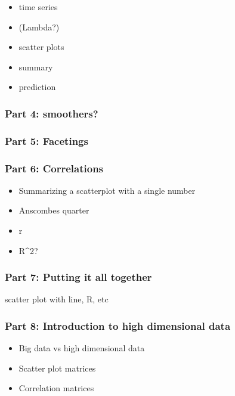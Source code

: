 \documentclass[
]{book}
\providecommand{\tightlist}{%
  \setlength{\itemsep}{0pt}\setlength{\parskip}{0pt}}
\begin{document}
\begin{itemize}
\tightlist
\item
  time series
\item
  (Lambda?)
\item
  scatter plots
\item
  summary
\item
  prediction
\end{itemize}

\hypertarget{part-4-smoothers}{%
\subsubsection{Part 4: smoothers?}\label{part-4-smoothers}}

\hypertarget{part-5-facetings}{%
\subsubsection{Part 5: Facetings}\label{part-5-facetings}}

\hypertarget{part-6-correlations}{%
\subsubsection{Part 6: Correlations}\label{part-6-correlations}}

\begin{itemize}
\tightlist
\item
  Summarizing a scatterplot with a single number
\item
  Anscombes quarter
\item
  r
\item
  R\^{}2?
\end{itemize}

\hypertarget{part-7-putting-it-all-together}{%
\subsubsection{Part 7: Putting it all together}\label{part-7-putting-it-all-together}}

scatter plot with line, R, etc

\hypertarget{part-8-introduction-to-high-dimensional-data}{%
\subsubsection{Part 8: Introduction to high dimensional data}\label{part-8-introduction-to-high-dimensional-data}}

\begin{itemize}
\tightlist
\item
  Big data vs high dimensional data
\item
  Scatter plot matrices
\item
  Correlation matrices
\end{itemize}
\end{document}
